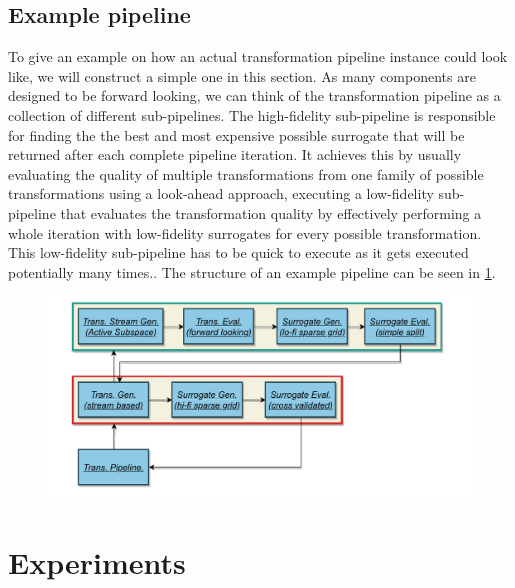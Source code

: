 \documentclass[
  a4paper,  %
  twoside,  %
  bibliography=totoc,
  headsepline,
  cleardoublepage=empty,
  parskip=half,
  draft=false
]{scrbook}
\begin{document}
\newpage
\section{Example pipeline}

To give an example on how an actual transformation pipeline instance could look like, we will construct a simple one in this section.
As many components are designed to be forward looking, we can think of the transformation pipeline as a collection of different sub-pipelines.
The high-fidelity sub-pipeline is responsible for finding the the best and most expensive possible surrogate that will be returned after each complete pipeline iteration.
It achieves this by usually evaluating the quality of multiple transformations from one family of possible transformations using a look-ahead approach, \ie executing a low-fidelity sub-pipeline that evaluates the transformation quality by effectively performing a whole iteration with low-fidelity surrogates for every possible transformation.
This low-fidelity sub-pipeline has to be quick to execute as it gets executed potentially many times..
The structure of an example pipeline can be seen in \cref{fig:tpex}.

\begin{mdframed}[style=style]
\begin{figure}[H]
\includegraphics[width=\textwidth]{graphics/PipelineExample.pdf}
\delimit

\label{fig:tpex}
\end{figure}
\end{mdframed}

\chapter{Experiments}
\label{chap:c7}
\end{document}
